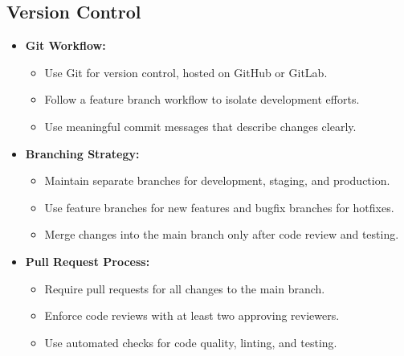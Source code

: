\subsection{Version Control}
\begin{itemize}[leftmargin=*]
    \item \textbf{Git Workflow:}
    \begin{itemize}
        \item Use Git for version control, hosted on GitHub or GitLab.
        \item Follow a feature branch workflow to isolate development efforts.
        \item Use meaningful commit messages that describe changes clearly.
    \end{itemize}
    
    \item \textbf{Branching Strategy:}
    \begin{itemize}
        \item Maintain separate branches for development, staging, and production.
        \item Use feature branches for new features and bugfix branches for hotfixes.
        \item Merge changes into the main branch only after code review and testing.
    \end{itemize}
    
    \item \textbf{Pull Request Process:}
    \begin{itemize}
        \item Require pull requests for all changes to the main branch.
        \item Enforce code reviews with at least two approving reviewers.
        \item Use automated checks for code quality, linting, and testing.
    \end{itemize}
\end{itemize}

